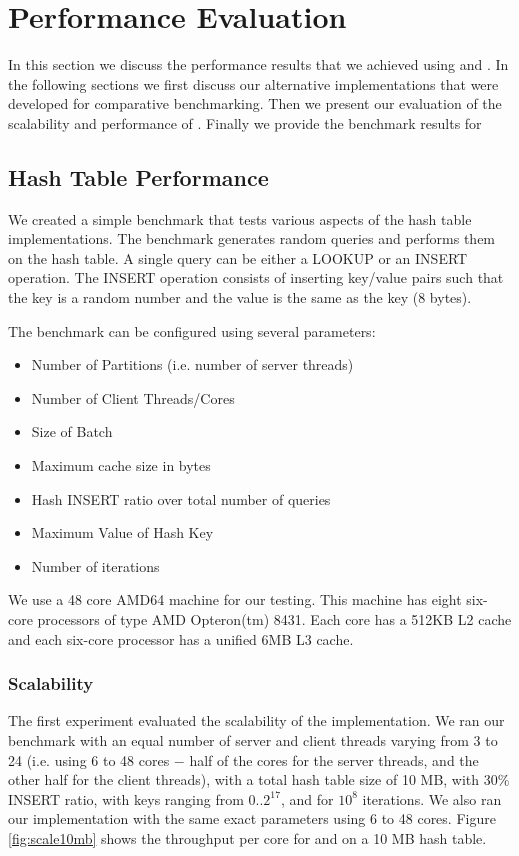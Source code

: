 \section{Performance Evaluation}
\label{sec:eval}

In this section we discuss the performance results that we achieved using \cphash{} and \cpserver{}. In the following sections we 
first discuss our alternative implementations that were developed for comparative benchmarking. Then we present our evaluation of the scalability 
and performance of \cphash{}. Finally we provide the benchmark results for \cpserver{}

\subsection{Hash Table Performance}

We created a simple benchmark that tests various aspects of the hash table implementations. The benchmark generates random queries and
performs them on the hash table. A single query can be either a LOOKUP or an INSERT operation. The INSERT operation consists of 
inserting key/value pairs such that the key is a random number and the value is the same as the key (8 bytes). 

The benchmark can be configured using several parameters:
\begin{itemize}
\item Number of Partitions (i.e. number of server threads)
\item Number of Client Threads/Cores
\item Size of Batch
\item Maximum cache size in bytes
\item Hash INSERT ratio over total number of queries
\item Maximum Value of Hash Key
\item Number of iterations
\end{itemize}

We use a 48 core AMD64 machine for our testing. This machine has eight six-core processors of type AMD Opteron(tm) 8431. Each core has
a 512KB L2 cache and each six-core processor has a unified 6MB L3 cache.

\subsubsection{Scalability}

The first experiment evaluated the scalability of the \cphash{} implementation. We ran our benchmark with an equal number of server 
and client threads varying from 3 to 24 (i.e. using 6 to 48 cores $-$ half of the cores for the server threads, and the other half for the 
client threads), with a total hash table size of 10 MB, with 30\% INSERT ratio, with keys ranging from 0..$2^{17}$, and for $10^{8}$ iterations. 
We also ran our \lockhash{} implementation with the same exact parameters using 6 to 48 cores. Figure \ref{fig:scale10mb} shows the 
throughput per core for \cphash{} and \lockhash{} on a 10 MB hash table.

